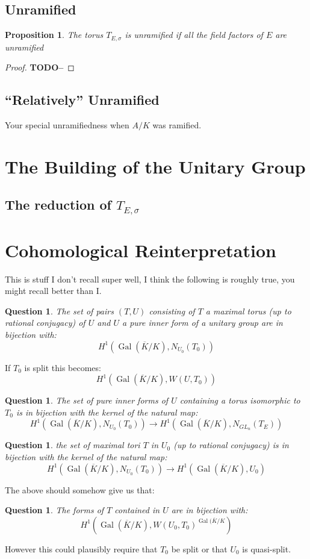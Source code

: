 \documentclass{article}
\theoremstyle{plain}
\newtheorem{proposition}[theorem]{Proposition}
\newtheorem{question}[theorem]{Question}
\theoremstyle{definition}
\DeclareMathOperator{\Gal}{Gal}
\newcommand{\TODO}[1]{\textbf{TODO-#1}}
\begin{document}
\subsection{Unramified}

\begin{proposition}
The torus $T_{E,\sigma}$ is unramified if all the field factors of $E$ are unramified
\end{proposition}
\begin{proof}
\TODO-
\end{proof}


\subsection{``Relatively'' Unramified}

Your special unramifiedness when $A/K$ was ramified.

\section{The Building of the Unitary Group}

\subsection{The reduction of $T_{E,\sigma}$}

\section{Cohomological Reinterpretation}

This is stuff I don't recall super well, I think the following is roughly true, you might recall better than I.

\begin{question}
The set of pairs $(T,U)$ consisting of $T$ a maximal torus (up to rational conjugacy) of $U$ and $U$ a pure inner form of a unitary group are in bijection with:
\[ H^1( \Gal(\overline{K}/K), N_{U_0}(T_0) ) \]
\end{question}
If $T_0$ is split this becomes:
\[ H^1( \Gal(\overline{K}/K), W(U,T_0) ) \]

\begin{question}
The set of pure inner forms of $U$ containing a torus isomorphic to $T_0$ is in bijection with the kernel of the natural map:
\[ H^1( \Gal(\overline{K}/K), N_{U_0}(T_0) ) \rightarrow H^1( \Gal(\overline{K}/K),N_{GL_n}(T_E )) \]
\end{question}

\begin{question}
the set of maximal tori $T$ in $U_0$ (up to rational conjugacy) is in bijection with the kernel of the natural map:
\[  H^1( \Gal(\overline{K}/K), N_{U_0}(T_0) ) \rightarrow H^1( \Gal(\overline{K}/K), U_0) \]
\end{question}

The above should somehow give us that:
\begin{question}
The forms of $T$ contained in $U$ are in bijection with:
\[ H^1(\Gal(\overline{K}/K), W(U_0,T_0)^{\Gal(\overline{K}/K} ) \]
\end{question}
However this could plausibly require that $T_0$ be split or that $U_0$ is quasi-split.
\end{document}

